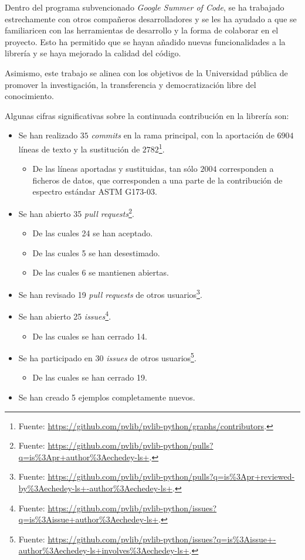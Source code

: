 Dentro del programa subvencionado \textit{Google Summer of Code}, se ha trabajado estrechamente con otros compañeros desarrolladores y se les ha ayudado a que se familiaricen con las herramientas de desarrollo y la forma de colaborar en el proyecto. Esto ha permitido que se hayan añadido nuevas funcionalidades a la librería y se haya mejorado la calidad del código.

Asimismo, este trabajo se alinea con los objetivos de la Universidad pública de promover la investigación, la transferencia y democratización libre del conocimiento.

Algunas cifras significativas sobre la continuada contribución en la librería \pvlibpy{} son:

\begin{itemize}
    \item Se han realizado $35$ \textit{commits} en la \gls{rama} principal, con la aportación de $6904$ líneas de texto y la sustitución de $2782$\footnote{Fuente: \url{https://github.com/pvlib/pvlib-python/graphs/contributors}.}.
          \begin{itemize}
              \item De las líneas aportadas y sustituidas, tan sólo $2004$ corresponden a ficheros de datos, que corresponden a una parte de la contribución de espectro \gls{estándar} ASTM G173-03.
          \end{itemize}
    \item Se han abierto 35 \textit{pull requests}\footnote{Fuente: \url{https://github.com/pvlib/pvlib-python/pulls?q=is\%3Apr+author\%3Aechedey-ls+}.}.
          \begin{itemize}
              \item De las cuales 24 se han aceptado.
              \item De las cuales 5 se han desestimado.
              \item De las cuales 6 se mantienen abiertas.
          \end{itemize}
    \item Se han revisado 19 \textit{pull requests} de otros usuarios\footnote{Fuente: \url{https://github.com/pvlib/pvlib-python/pulls?q=is\%3Apr+reviewed-by\%3Aechedey-ls+-author\%3Aechedey-ls+}.}.
    \item Se han abierto 25 \textit{issues}\footnote{Fuente: \url{https://github.com/pvlib/pvlib-python/issues?q=is\%3Aissue+author\%3Aechedey-ls+}.}.
          \begin{itemize}
              \item De las cuales se han cerrado 14.
          \end{itemize}
    \item Se ha participado en 30 \textit{issues} de otros usuarios\footnote{Fuente: \url{https://github.com/pvlib/pvlib-python/issues?q=is\%3Aissue+-author\%3Aechedey-ls+involves\%3Aechedey-ls+}.}.
          \begin{itemize}
              \item De las cuales se han cerrado 19.
          \end{itemize}
    \item Se han creado 5 ejemplos completamente nuevos.
\end{itemize}

